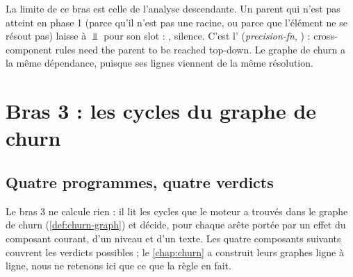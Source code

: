 La limite de ce bras est celle de l'analyse descendante. Un parent qui n'est pas atteint en phase 1 (parce qu'il n'est pas une racine, ou parce que l'élément  ne se résout pas) laisse  à $\Bot$ pour son slot : , silence. C'est l' (\emph{precision-fn}, ) : \og cross-component rules need the parent to be reached top-down\fg. Le graphe de churn a la même dépendance, puisque ses lignes  viennent de la même résolution.

\section{Bras 3 : les cycles du graphe de churn}
\label{sec:infinite-loop-graphe}

\subsection{Quatre programmes, quatre verdicts}

Le bras 3 ne calcule rien : il lit les cycles que le moteur a trouvés dans le graphe de churn (\cref{def:churn-graph}) et décide, pour chaque arête portée par un effet du composant courant, d'un niveau et d'un texte. Les quatre composants suivants couvrent les verdicts possibles ; le \cref{chap:churn} a construit leurs graphes ligne à ligne, nous ne retenons ici que ce que la règle en fait.

